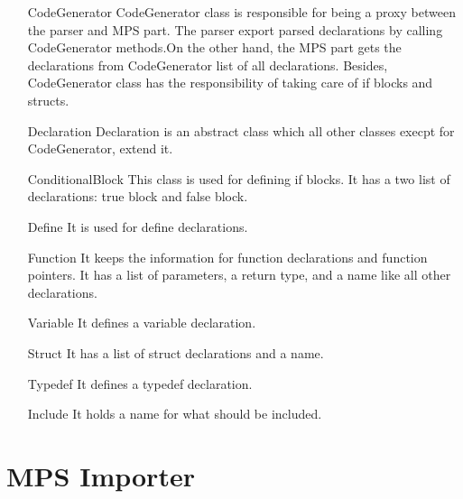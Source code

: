 \documentclass{article}
\begin{document}
\begin{itemize}
\item[CodeGenerator]
CodeGenerator class is responsible for being a proxy between the parser and MPS part. The parser export parsed declarations by calling CodeGenerator methods.On the other hand, the MPS part gets the declarations from CodeGenerator list of all declarations. Besides, CodeGenerator class has the responsibility of taking care of if blocks and structs.
\item[Declaration]
Declaration is an abstract class which all other classes execpt for CodeGenerator, extend it.
\item[ConditionalBlock]
This class is used for defining if blocks. It has a two list of declarations: true block and false block.
\item[Define]
It is used for define declarations.
\item[Function]
It keeps the information for function declarations and function pointers. It has a list of parameters, a return type, and a name like all other declarations. 
\item[Variable]
It defines a variable declaration.
\item[Struct]
It has a list of struct declarations and a name.
\item[Typedef]
It defines a typedef declaration.
\item[Include]
It holds a name for what should be included.
\end{itemize}

\section{MPS Importer}
\end{document}
